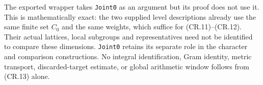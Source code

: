 The exported wrapper takes \texttt{Joint0} as an argument but its
proof does not use it. This is mathematically exact: the two supplied
level descriptions already use the same finite set $C_0$ and the
same weights, which suffice for (CR.11)--(CR.12). Their actual
lattices, local subgroups and representatives need not be identified
to compare these dimensions. \texttt{Joint0} retains its separate
role in the character and comparison constructions. No integral
identification, Gram identity, metric transport, discarded-target
estimate, or global arithmetic window follows from (CR.13) alone.
